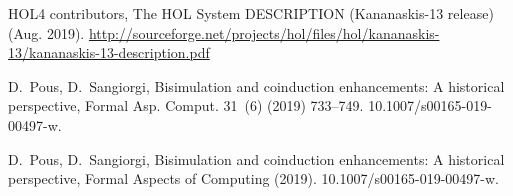 \documentclass[GCNS]{yincog}
\theoremstyle{remark}
\theoremstyle{theorem}
\theoremstyle{remark}
\begin{document}
\begin{backmatter}
\begin{thebibliography}{}
\begin{bsubitem}
\begin{bcontribution}%
\end{bcontribution}
\begin{bhost}
\begin{bbook}%
\end{bbook}
\end{bhost}
\begin{bhost}
\begin{behost}
\end{behost}
\end{bhost}
\end{bsubitem}
%
\OrigBibText
{HOL4 contributors},
{{The
HOL System DESCRIPTION (Kananaskis-13 release)}} (Aug. 2019).
\url{http://sourceforge.net/projects/hol/files/hol/kananaskis-13/kananaskis-13-description.pdf}
\endOrigBibText
{}%
\endbibitem

\begin{bsubitem}
\begin{bcontribution}%
\end{bcontribution}
\begin{bhost}
\begin{bissue}
\end{bissue}
\end{bhost}
\end{bsubitem}
%
\OrigBibText
D.~Pous, D.~Sangiorgi, Bisimulation and coinduction enhancements: {A} historical
perspective, Formal Asp. Comput. 31~(6) (2019) 733--749. 10.1007/s00165-019-00497-w.
\endOrigBibText
{}%
\endbibitem

\begin{bsubitem}
\begin{bcontribution}%
\end{bcontribution}
\begin{bhost}
\begin{bissue}
\end{bissue}
\end{bhost}
\end{bsubitem}
%
\OrigBibText
D.~Pous, D.~Sangiorgi, Bisimulation and coinduction enhancements: A historical
perspective, Formal Aspects of Computing (2019). 10.1007/s00165-019-00497-w.
\endOrigBibText
{}%
\endbibitem


\end{thebibliography}
\end{backmatter}
\end{document}
